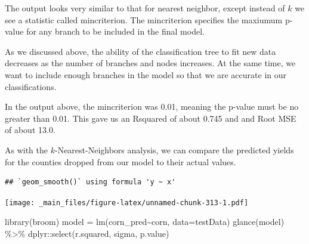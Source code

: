 \documentclass[
]{book}
\newenvironment{Shaded}{\begin{snugshade}}{\end{snugshade}}
\newcommand{\AttributeTok}[1]{\textcolor[rgb]{0.77,0.63,0.00}{#1}}
\newcommand{\FunctionTok}[1]{\textcolor[rgb]{0.00,0.00,0.00}{#1}}
\newcommand{\NormalTok}[1]{#1}
\newcommand{\OtherTok}[1]{\textcolor[rgb]{0.56,0.35,0.01}{#1}}
\newcommand{\SpecialCharTok}[1]{\textcolor[rgb]{0.00,0.00,0.00}{#1}}
\newcommand{\StringTok}[1]{\textcolor[rgb]{0.31,0.60,0.02}{#1}}
\begin{document}
The output looks very similar to that for nearest neighbor, except instead of \(k\) we see a statistic called mincriterion. The mincriterion specifies the maxiumum p-value for any branch to be included in the final model.

As we discussed above, the ability of the classification tree to fit new data decreases as the number of branches and nodes increases. At the same time, we want to include enough branches in the model so that we are accurate in our classifications.

In the output above, the mincriterion was 0.01, meaning the p-value must be no greater than 0.01. This gave us an Rsquared of about 0.745 and and Root MSE of about 13.0.

As with the \(k\)-Nearest-Neighbors analysis, we can compare the predicted yields for the counties dropped from our model to their actual values.

\begin{Shaded}
\end{Shaded}

\begin{verbatim}
## `geom_smooth()` using formula 'y ~ x'
\end{verbatim}

\texttt{[image: \_main\_files/figure-latex/unnamed-chunk-313-1.pdf]}

\begin{Shaded}
\begin{Highlighting}[]
\FunctionTok{library}\NormalTok{(broom)}
\NormalTok{model }\OtherTok{=} \FunctionTok{lm}\NormalTok{(corn\_pred}\SpecialCharTok{\textasciitilde{}}\NormalTok{corn, }\AttributeTok{data=}\NormalTok{testData)}
\FunctionTok{glance}\NormalTok{(model) }\SpecialCharTok{\%\textgreater{}\%}
\NormalTok{  dplyr}\SpecialCharTok{::}\FunctionTok{select}\NormalTok{(r.squared, sigma, p.value) }
\end{Highlighting}
\end{Shaded}
\end{document}
